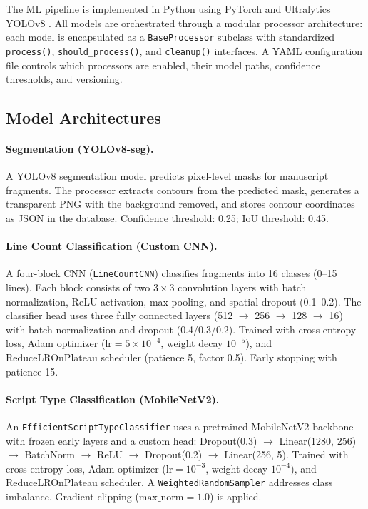 \documentclass[11pt]{article}
\begin{document}
The ML pipeline is implemented in Python using PyTorch \citep{paszke2019pytorch} and Ultralytics YOLOv8 \citep{jocher2023yolov8}.
All models are orchestrated through a modular processor architecture: each model is encapsulated as a \texttt{BaseProcessor} subclass with standardized \texttt{process()}, \texttt{should\_process()}, and \texttt{cleanup()} interfaces.  A YAML configuration file controls which processors are enabled, their model paths, confidence thresholds, and versioning.

\subsection{Model Architectures}

\paragraph{Segmentation (YOLOv8-seg).}
A YOLOv8 segmentation model predicts pixel-level masks for manuscript fragments.  The processor extracts contours from the predicted mask, generates a transparent PNG with the background removed, and stores contour coordinates as JSON in the database.  Confidence threshold: 0.25; IoU threshold: 0.45.

\paragraph{Line Count Classification (Custom CNN).}
A four-block CNN (\texttt{LineCountCNN}) classifies fragments into 16 classes (0--15 lines).  Each block consists of two $3 \times 3$ convolution layers with batch normalization, ReLU activation, max pooling, and spatial dropout (0.1--0.2).  The classifier head uses three fully connected layers (512 $\to$ 256 $\to$ 128 $\to$ 16) with batch normalization and dropout (0.4/0.3/0.2).
Trained with cross-entropy loss, Adam optimizer ($\text{lr} = 5 \times 10^{-4}$, weight decay $10^{-5}$), and ReduceLROnPlateau scheduler (patience 5, factor 0.5).  Early stopping with patience 15.

\paragraph{Script Type Classification (MobileNetV2).}
An \texttt{EfficientScriptTypeClassifier} uses a pretrained MobileNetV2 backbone with frozen early layers and a custom head: Dropout(0.3) $\to$ Linear(1280, 256) $\to$ BatchNorm $\to$ ReLU $\to$ Dropout(0.2) $\to$ Linear(256, 5).
Trained with cross-entropy loss, Adam optimizer ($\text{lr} = 10^{-3}$, weight decay $10^{-4}$), and ReduceLROnPlateau scheduler.
A \texttt{WeightedRandomSampler} addresses class imbalance. Gradient clipping ($\text{max\_norm} = 1.0$) is applied.
\end{document}
